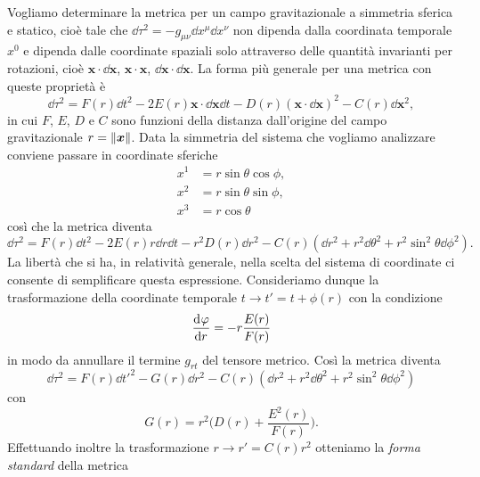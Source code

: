 Vogliamo determinare la metrica per un campo gravitazionale a simmetria sferica
e statico, cioè tale che $\dd\tau^{2} = -g_{\mu\nu}\dd x^{\mu}\dd x^{\nu}$ non
dipenda dalla coordinata temporale $x^{0}$ e dipenda dalle coordinate spaziali
solo attraverso delle quantità invarianti per rotazioni, cioè
$\bm{x} \cdot \dd\bm{x}$, $\bm{x} \cdot \bm{x}$, $\dd\bm{x} \cdot \dd\bm{x}$.
La forma più generale per una metrica con queste proprietà è
\begin{equation}
  \dd\tau^{2} = F(r) \dd t^{2} - 2E(r) \bm{x} \cdot \dd\bm{x} \dd t -
  D(r)(\bm{x} \cdot \dd\bm{x})^{2} - C(r)\dd\bm{x}^{2},
\end{equation}
in cui $F$, $E$, $D$ e $C$ sono funzioni della distanza dall'origine del campo
gravitazionale $r = \lVert\bm{x}\rVert$.  Data la simmetria del sistema che vogliamo
analizzare conviene passare in coordinate sferiche
\begin{subequations}
  \begin{align}
    x^{1} &= r \sin\theta \cos\phi, \\
    x^{2} &= r \sin\theta \sin\phi, \\
    x^{3} &= r \cos\theta
  \end{align}
\end{subequations}
così che la metrica diventa
\begin{equation}
  \dd\tau^{2} = F(r) \dd t^{2} - 2E(r) r\dd r\dd t - r^{2}D(r)\dd r^{2} -
  C(r)(\dd r^{2} + r^{2}\dd\theta^{2} + r^{2}\sin^{2}\theta \dd\phi^{2}).
\end{equation}
La libertà che si ha, in relatività generale, nella scelta del sistema di
coordinate ci consente di semplificare questa espressione.  Consideriamo dunque
la trasformazione della coordinate temporale $t \to t' = t + \phi(r)$ con la
condizione
\begin{equation}
  \frac{{\mathop{}\!\mathrm{d}^{}}\varphi}{\mathop{}\!\mathrm{d} {r}^{}} = - r\frac{E(r)}{F(r)}
\end{equation}
in modo da annullare il termine $g_{rt}$ del tensore metrico.  Così la metrica
diventa
\begin{equation}
  \dd \tau^{2} = F(r)\dd t'^{2} - G(r)\dd r^{2} -C(r)(\dd r^{2} +
  r^{2}\dd\theta^{2} + r^{2}\sin^{2}\theta \dd\phi^{2})
\end{equation}
con
\begin{equation}
  G(r) = r^{2} \bigg(D(r) + \frac{E^{2}(r)}{F(r)} \bigg).
\end{equation}
Effettuando inoltre la trasformazione $r \to r' = C(r)r^{2}$ otteniamo la
\emph{forma standard} della metrica
